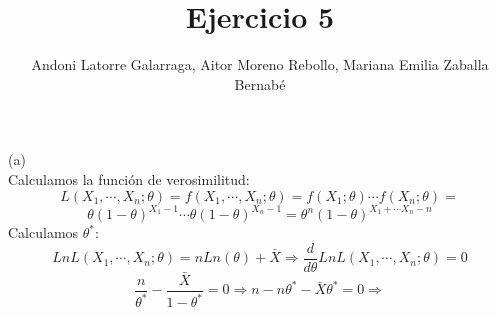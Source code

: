 \documentclass{article}
\title{Ejercicio 5}
\author{Andoni Latorre Galarraga, Aitor Moreno Rebollo, Mariana Emilia Zaballa Bernabé}
\date{}
\begin{document}
\maketitle

(a)\\
Calculamos la función de verosimilitud:
$$
L(X_1, \cdots, X_n;\theta)=f(X_1, \cdots, X_n;\theta) = f(X_1;\theta) \cdots f(X_n;\theta) =
$$
$$
\theta (1 - \theta)^{X_1 - 1} \cdots \theta (1 - \theta)^{X_n - 1}
= \theta^n (1 - \theta)^{X_1 + \cdots X_n - n}
$$
Calculamos $\theta^*$:
$$
LnL(X_1, \cdots, X_n;\theta) = n Ln(\theta) + \bar{X} \Rightarrow \frac{d}{d\theta} LnL(X_1, \cdots, X_n;\theta) = 0
$$
$$
\frac{n}{\theta^*}-\frac{\bar{X}}{1-\theta^*} = 0 \Rightarrow n - n \theta^* - \bar{X} \theta^* = 0 \Rightarrow 
$$
\end{document}
